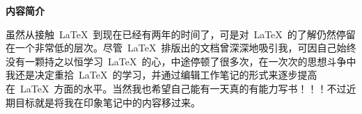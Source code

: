 \begin{center}
\textbf{内容简介}
\end{center}
\thispagestyle{empty}

虽然从接触~\LaTeX~到现在已经有两年的时间了，可是对~\LaTeX~的了解仍然停留在一个非常低的层次。尽管~\LaTeX~排版出的文档曾深深地吸引我，可因自己始终没有一颗持之以恒学习~\LaTeX~的心，中途停顿了很多次，在一次次的思想斗争中我还是决定重拾~\LaTeX~的学习，并通过编辑工作笔记的形式来逐步提高在~\LaTeX~方面的水平。当然我也希望自己能有一天真的有能力写书！！！不过近期目标就是将我在印象笔记中的内容移过来。